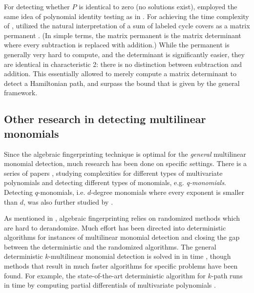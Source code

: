 For detecting whether $P$ is identical to zero (no solutions exist), \citeauthor{Björklund14} 
employed the same idea of polynomial identity testing as in .
For achieving the time complexity of , \citeauthor{Björklund14} 
utilized the natural interpretation of a sum of labeled cycle covers as 
a matrix permanent \cite{Björklund14}.
(In simple terms, the matrix permanent is 
the matrix determinant where every subtraction is replaced with addition.) 
While the permanent is generally very hard to compute, and the determinant is significantly easier, 
they are identical in characteristic 2: there is no distinction between subtraction and addition. 
This essentially allowed \citeauthor{Björklund14} to merely compute a matrix determinant 
to detect a Hamiltonian path, 
and surpass the  bound 
that is given by the general framework.

\subsection{Other research in detecting multilinear monomials}
\label{sect:other_improvements}

Since the algebraic fingerprinting technique is optimal for 
the \emph{general} multilinear monomial detection, much research has been 
done on specific settings. There is a series of papers \cite{Chen10, Chen11a, Chen11b, Chen13a}, 
studying complexities for different types of multivariate polynomials and 
detecting different types of monomials, e.g. \emph{q-monomials}. 
Detecting $q$-monomials, i.e. $d$-degree monomials where every exponent is smaller than $d$, 
was also further studied by \textcite{Chen14}.

As mentioned in , algebraic fingerprinting 
relies on randomized methods which are hard to derandomize. 
Much effort \cite{Chen13b, Chen13c, Fomin17, Pratt19, Brand19, Brand21, Brand22} 
has been directed into deterministic algorithms for 
instances of multilinear monomial detection and 
closing the gap between the deterministic and the randomized algorithms. 
The general deterministic $k$-multilinear monomial detection is solved in
in  time \cite{Fomin17}, though methods that result in 
much faster algorithms for specific problems 
have been found. For example, the state-of-the-art deterministic algorithm for $k$-path 
runs in  time by computing partial differentials of multivariate polynomials \cite{Brand21}.

